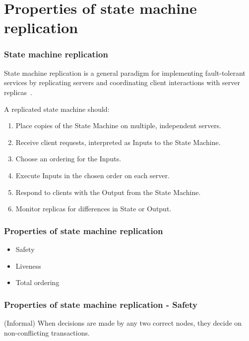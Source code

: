 \documentclass{beamer}
\begin{document}


\section{Properties of state machine replication}


\begin{frame}
\frametitle{State machine replication}

State machine replication is a general paradigm for implementing fault-tolerant services by replicating servers and coordinating client interactions with server replicas~\cite{schneider1990implementing}.

A replicated state machine should:

\begin{enumerate}
    \item Place copies of the State Machine on multiple, independent servers.
    \item Receive client requests, interpreted as Inputs to the State Machine.
    \item Choose an ordering for the Inputs.
    \item Execute Inputs in the chosen order on each server.
    \item Respond to clients with the Output from the State Machine.
    \item Monitor replicas for differences in State or Output.
\end{enumerate}




\end{frame}

\begin{frame}
\frametitle{Properties of state machine replication}

\begin{itemize}
    \item Safety
    \item Liveness
    \item Total ordering
\end{itemize}

\end{frame}

\begin{frame}
\frametitle{Properties of state machine replication - Safety}

(Informal) When decisions are made by any two correct nodes, they decide on non-conflicting transactions.

\end{frame}
\end{document}
